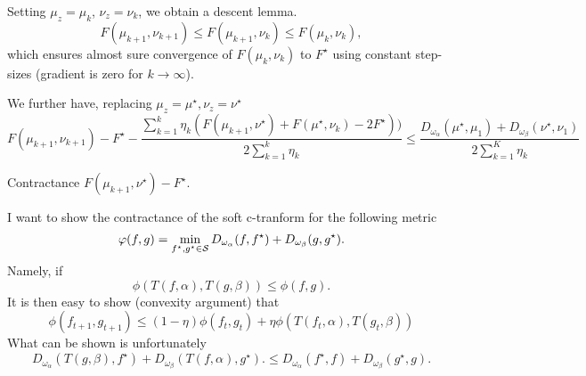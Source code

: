 \documentclass[a4paper, 10pt]{article}
\begin{document}
Setting $\mu_z = \mu_{k}$, $\nu_z = \nu_k$, we obtain a descent lemma.
\begin{equation}
    F(\mu_{k+1}, \nu_{k+1}) \leq F(\mu_{k+1}, \nu_{k}) \leq F(\mu_{k}, \nu_{k}),
\end{equation}
which ensures almost sure convergence of $F(\mu_k, \nu_k)$ to $F^\star$ using constant step-sizes (gradient is zero for $k \to \infty$).

We further have, replacing $\mu_z = \mu^\star, \nu_z = \nu^\star$
%
\begin{equation}
    F(\mu_{k+1}, \nu_{k+1}) - F^\star
    - \frac{
        \sum_{k=1}^k \eta_k (F(\mu_{k+1}, \nu^\star)
    +F(\mu^\star, \nu_k) - 2 F^\star))
    }
    {2 \sum_{k=1}^k \eta_k}
    \leq \frac{
    D_{\omega_\alpha}(\mu^\star, \mu_1)
    + D_{\omega_\beta}(\nu^\star, \nu_1)
    }{2 \sum_{k=1}^K \eta_k}
\end{equation}

Contractance $F(\mu_{k+1}, \nu^\star) - F^\star$.

I want to show the contractance of the soft c-tranform for the following metric
\begin{equation}
    \varphi(f, g) = \min_{f^\star, g^\star \in \mathcal{S}} 
    D_{\omega_\alpha}(f, f^\star)
    +
    D_{\omega_\beta}(g, g^\star).
\end{equation}
Namely, if 
\begin{equation}
    \phi(T(f,\alpha), T(g,\beta))
    \leq \phi(f, g).
\end{equation}
It is then easy to show (convexity argument) that
\begin{equation}
    \phi(f_{t+1}, g_{t+1}) \leq
    (1-\eta) 
    \phi(f_t, g_t)
    + \eta \phi(T(f_t,\alpha), T(g_t,\beta))
\end{equation}
What can be shown is unfortunately
\begin{equation}
    D_{\omega_\alpha}(T(g,\beta), f^\star) +
    D_{\omega_\beta}(T(f,\alpha), g^\star). \leq
    D_{\omega_\alpha}(f^\star, f)
    +
    D_{\omega_\beta}(g^\star, g).
\end{equation}
\printbibliography
\end{document}
